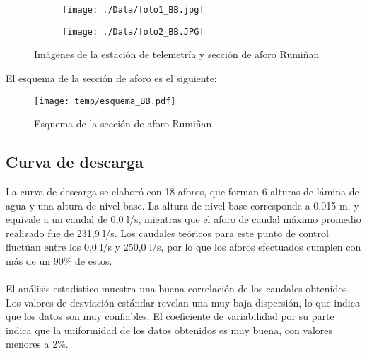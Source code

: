 \documentclass[]{article}
\begin{document}
\begin{figure}[H]
  \centering
\begin{subfigure}{.49\textwidth}
  \texttt{[image: ./Data/foto1\_BB.jpg]}
\end{subfigure}
\hfill
\begin{subfigure}{.49\textwidth}
  \texttt{[image: ./Data/foto2\_BB.JPG]}
\end{subfigure}
\caption{Imágenes de la estación de telemetría y sección de aforo Rumiñan}
\label{fig:fotos_28}
\end{figure}

El esquema de la sección de aforo es el siguiente:

\begin{figure}[H]
  \centering
  \texttt{[image: temp/esquema\_BB.pdf]}
\caption{Esquema de la sección de aforo Rumiñan}
\label{fig:Esquema_BB}
\end{figure}

\subsection{Curva de descarga}\label{curva-de-descarga-27}

La curva de descarga se elaboró con 18 aforos, que forman 6 alturas de lámina de agua y una altura de nivel base. La altura de nivel base corresponde a 0,015 m, y equivale a un caudal de 0,0 l/s, mientras que el aforo de caudal máximo promedio realizado fue de 231,9 l/s. Los caudales teóricos para este punto de control fluctúan entre los 0,0 l/s y 250,0 l/s, por lo que los aforos efectuados cumplen con más de un 90\% de estos.\\
\\
El análisis estadístico muestra una buena correlación de los caudales obtenidos. Los valores de desviación estándar revelan una muy baja dispersión, lo que indica que los datos son muy confiables. El coeficiente de variabilidad por su parte indica que la uniformidad de los datos obtenidos es muy buena, con valores menores a 2\%.
\end{document}
